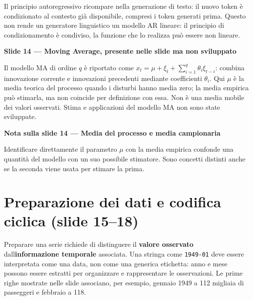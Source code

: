 \documentclass[11pt,a4paper,oneside,openany]{book}
\renewenvironment{quote}{\list{}{\leftmargin=1em\rightmargin=0pt}\item\relax}{\endlist}
\begin{document}
Il principio autoregressivo ricompare nella generazione di testo: il nuovo token è condizionato al contesto già disponibile, compresi i token generati prima. Questo non rende un generatore linguistico un modello AR lineare: il principio di condizionamento è condiviso, la funzione che lo realizza può essere non lineare.

\begin{quote}
\textbf{Slide 14 --- Moving Average, presente nelle slide ma non sviluppato}
\end{quote}

\begin{quote}
Il modello MA di ordine \(q\) è riportato come \(x_t=\mu+\xi_t+\sum_{i=1}^q\theta_i\xi_{t-i}\): combina innovazione corrente e innovazioni precedenti mediante coefficienti \(\theta_i\). Qui \(\mu\) è la media teorica del processo quando i disturbi hanno media zero; la media empirica può stimarla, ma non coincide per definizione con essa. Non è una media mobile dei valori osservati. Stima e applicazioni del modello MA non sono state sviluppate.
\end{quote}

\begin{quote}
\textbf{Nota sulla slide 14 --- Media del processo e media campionaria}
\end{quote}

\begin{quote}
Identificare direttamente il parametro \(\mu\) con la media empirica confonde una quantità del modello con un suo possibile stimatore. Sono concetti distinti anche se la seconda viene usata per stimare la prima.
\end{quote}

\section{Preparazione dei dati e codifica ciclica (slide 15--18)}\label{f03-r172}

Preparare una serie richiede di distinguere il \textbf{valore osservato} dall\textquotesingle{}\textbf{informazione temporale} associata. Una stringa come \texttt{1949-01} deve essere interpretata come una data, non come una generica etichetta: anno e mese possono essere estratti per organizzare e rappresentare le osservazioni. Le prime righe mostrate nelle slide associano, per esempio, gennaio 1949 a 112 migliaia di passeggeri e febbraio a 118.
\end{document}
